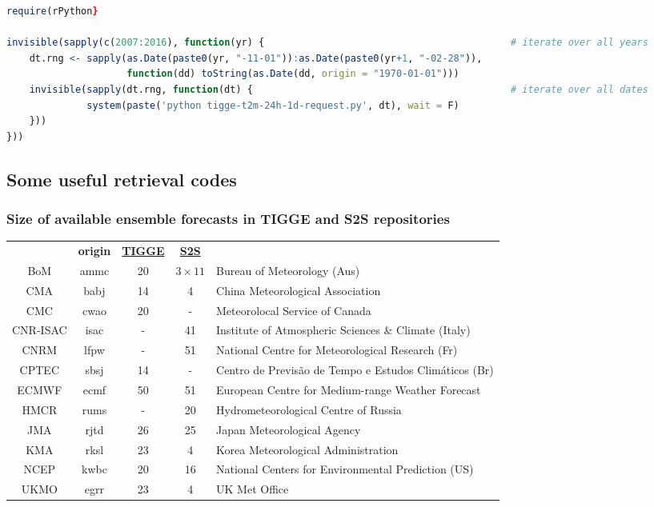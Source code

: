 \documentclass[10pt,fleqn]{article}
\begin{document}
\begin{lstlisting}[language = R]
require(rPython}
	          
invisible(sapply(c(2007:2016), function(yr) {											# iterate over all years
	dt.rng <- sapply(as.Date(paste0(yr, "-11-01")):as.Date(paste0(yr+1, "-02-28")),
                     function(dd) toString(as.Date(dd, origin = "1970-01-01")))
	invisible(sapply(dt.rng, function(dt) {												# iterate over all dates
	          system(paste('python tigge-t2m-24h-1d-request.py', dt), wait = F)
	}))
}))
\end{lstlisting}

\newpage
\subsection{Some useful retrieval codes}

\subsubsection{Size of available ensemble forecasts in TIGGE and S2S repositories}

\begin{tabular}{c>{\ttfamily}cccl}
& \textbf{origin}& \textbf{\href{https://software.ecmwf.int/wiki/display/TIGGE/Models}{TIGGE}} & \textbf{\href{https://software.ecmwf.int/wiki/display/S2S/Models}{S2S}} & \\
BoM & ammc &20 &$3\times11$ & Bureau of Meteorology (Aus) \\
CMA & babj &14 &4 & China Meteorological Association \\
CMC & cwao &20 &-& Meteorolocal Service of Canada \\
CNR-ISAC & isac &-&41 & Institute of Atmospheric Sciences \& Climate (Italy)\\
CNRM & lfpw &-&51 & National Centre for Meteorological Research (Fr)\\
CPTEC & sbsj &14 &-& Centro de Previs\~{a}o de Tempo e Estudos Clim\'{a}ticos (Br) \\
ECMWF & ecmf &50 &51 &  European Centre for Medium-range Weather Forecast \\
HMCR & rums &-&20 & Hydrometeorological Centre of Russia\\
JMA & rjtd &26 &25 & Japan Meteorological Agency \\
KMA & rksl & 23 & 4 & Korea Meteorological Administration\\
NCEP & kwbc &20 &16 & National Centers for Environmental Prediction (US) \\
UKMO & egrr &23 &4 & UK Met Office\\
\end{tabular}
\end{document}
